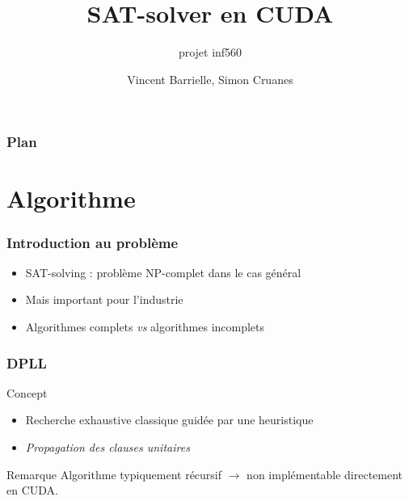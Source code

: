 \documentclass{beamer}
\newcommand{\cuda}{\textsc{CUDA}}
\begin{document}

\author{Vincent Barrielle, Simon Cruanes}
\title{SAT-solver en \cuda}
\subtitle{projet inf560}



\begin{frame}
\titleframe
\titlepage
\end{frame}

\begin{frame}
\frametitle{Plan}
\small \tableofcontents%
\normalsize
\end{frame}

\section{Algorithme}
\begin{frame}
\frametitle{Introduction au problème}
\begin{itemize}
    \item SAT-solving : problème NP-complet dans le cas général
    \pause
    \item Mais important pour l'industrie
    \pause
    \item Algorithmes complets \emph{vs} algorithmes incomplets %
\end{itemize}
\end{frame}

\begin{frame}
\frametitle{DPLL}
\begin{block}{Concept}
\begin{itemize}
    \item Recherche exhaustive classique guidée par une heuristique
    \item \emph{Propagation des clauses unitaires}
\end{itemize}
    \pause
\end{block}

\begin{block}{Remarque}
    Algorithme typiquement récursif $\rightarrow$ non implémentable directement en \cuda.
\end{block}
\end{frame}


\medskip
\end{document}
